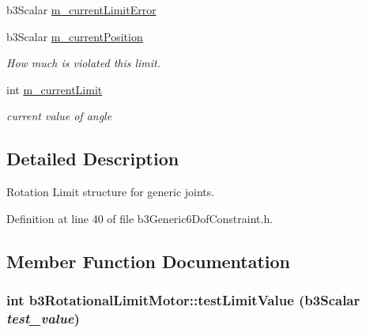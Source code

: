 \begin{Indent}{\bf }\par
\begin{CompactItemize}
\item 
b3Scalar \hyperlink{classb3_rotational_limit_motor_63167fcd92370cd81b058b9013aa2342}{m\_\-currentLimitError}
\item 
\hypertarget{classb3_rotational_limit_motor_335bfaa66cbcd0c059e7db31455bea17}{
b3Scalar \hyperlink{classb3_rotational_limit_motor_335bfaa66cbcd0c059e7db31455bea17}{m\_\-currentPosition}}
\label{classb3_rotational_limit_motor_335bfaa66cbcd0c059e7db31455bea17}

\begin{CompactList}\small\item\em How much is violated this limit. \item\end{CompactList}\item 
int \hyperlink{classb3_rotational_limit_motor_04210dff8941deee039e6c290a50f301}{m\_\-currentLimit}
\begin{CompactList}\small\item\em current value of angle \item\end{CompactList}\end{CompactItemize}
\end{Indent}


\subsection{Detailed Description}
Rotation Limit structure for generic joints. 

Definition at line 40 of file b3Generic6DofConstraint.h.

\subsection{Member Function Documentation}
\hypertarget{classb3_rotational_limit_motor_27246819c09d6029fb7f7c2f506ac9fd}{
\subsubsection[testLimitValue]{\setlength{\rightskip}{0pt plus 5cm}int b3RotationalLimitMotor::testLimitValue (b3Scalar {\em test\_\-value})}}
\label{classb3_rotational_limit_motor_27246819c09d6029fb7f7c2f506ac9fd}


